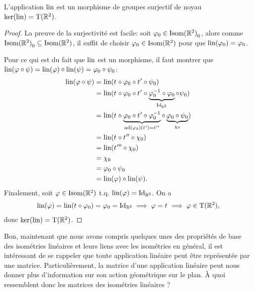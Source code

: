 \documentclass{book}
\numberwithin{equation}{section}
\renewcommand{\phi}{\varphi}
\providecommand{\plan}{{\mathbb R^2}}
\providecommand{\id}{{\textnormal{Id}}}
\providecommand{\IdR}{{\id_\plan}}
\providecommand{\transR}{{\textnormal{T}(\plan)}}
\providecommand{\isom}{{\textnormal{Isom}(\plan)}}
\providecommand{\isomo}{{\isom_0}}
\providecommand{\ker}{{\textnormal{ker}}}
\providecommand{\trans}[1]{{t_{#1}}}
\providecommand{\lin}{{\textnormal{lin}}}
\providecommand{\ad}{{\textnormal{ad}}}
\begin{document}
\begin{thm}
	L'application $\lin$ est un morphisme de groupes surjectif de noyau $\ker(\lin) = \transR$.
\end{thm}
\begin{proof}
	La preuve de la surjectivité est facile: soit $\phi_0 \in \isomo$, alors comme $\isomo \subseteq \isom$, il suffit de choisir $\phi_0 \in \isom$ pour que $\lin(\phi_0) = \phi_0$.\par
	Pour ce qui est du fait que $\lin$ est un morphisme, il faut montrer que $\lin(\phi \circ \psi) = \lin(\phi) \circ \lin(\psi) = \phi_0 \circ \psi_0$:
	\begin{align*}
		\lin(\phi \circ \psi) &= \lin(\trans{} \circ \phi_0 \circ \trans{}' \circ \psi_0)\\
		&= \lin(\trans{} \circ \phi_0 \circ \trans{}' \circ \underbrace{\phi_0^{-1} \circ \phi_0}_{\IdR} \circ \psi_0)\\
		&= \lin(\trans{} \circ \underbrace{\phi_0 \circ \trans{}' \circ \phi_0^{-1}}_{\ad(\phi_9)(\trans{}') = \trans{}''} \circ \underbrace{\phi_0 \circ \psi_0}_{\chi_0})\\
		&= \lin(\trans{} \circ \trans{}'' \circ \chi_0)\\
		&= \lin(\trans{}''' \circ \chi_0)\\
		&= \chi_0\\
		&= \phi_0 \circ \psi_0\\
		&= \lin(\phi) \circ \lin(\psi).
	\end{align*}
	Finalement, soit $\phi \in \isom$ t.q. $\lin(\phi) = \IdR$. On a
	\begin{align*}
		\lin(\phi) = \lin(\trans{} \circ \phi_0) = \phi_0 = \IdR \implies \phi = \trans{} \implies \phi \in \transR,
	\end{align*}
	donc $\ker(\lin) = \transR$.
\end{proof}

Bon, maintenant que nous avons compris quelques unes des propriétés de base des isométries linéaires et leurs liens avec les isométries en général, il est intéressant de se rappeler que toute application linéaire peut être représentée par une matrice. Particulièrement, la matrice d'une application linéaire peut nous donner plus d'information sur son action géométrique sur le plan. À quoi ressemblent donc les matrices des isométries linéaires ?
\end{document}
